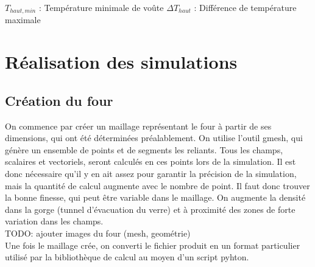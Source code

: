 \documentclass[12pt, a4paper, french, BCOR = 0pt, DIV = 10]{scrartcl}
\begin{document}
    
    
    $T_{haut, min}$ : Température minimale de voûte
    \break
    $\Delta T_{haut}$ : Différence de température maximale


	
	\section{Réalisation des simulations}

    \subsection{Création du four}
    On commence par créer un maillage représentant le four à partir de ses dimensions, qui ont été déterminées préalablement. On utilise l'outil gmesh, qui génère un ensemble de points et de segments les reliants. Tous les champs, scalaires et vectoriels, seront calculés en ces points lors de la simulation. Il est donc nécessaire qu'il y en ait assez pour garantir la précision de la simulation, mais la quantité de calcul augmente avec le nombre de point. Il faut donc trouver la bonne finesse, qui peut être variable dans le maillage. On augmente la densité dans la gorge (tunnel d'évacuation du verre) et à proximité des zones de forte variation dans les champs.\\
    TODO: ajouter images du four (mesh, geométrie)\\
    Une fois le maillage crée, on converti le fichier produit en un format particulier utilisé par la bibliothèque de calcul au moyen d'un script pyhton.
\end{document}
